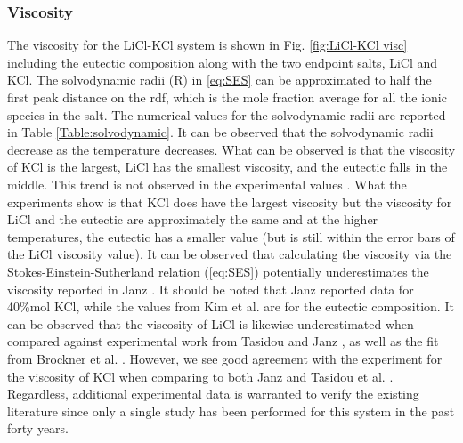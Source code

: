 \documentclass[review]{elsarticle}
\providecommand{\DIFdelbegin}{} %
\newcommand{\DIFscaledelfig}{0.5}
\newlength{\DIFdelgraphicswidth} %
\newlength{\DIFdelgraphicsheight} %
\newcommand{\DIFdelincludegraphics}[2][]{%
\sbox{\DIFdelgraphicsbox}{\DIFOincludegraphics[#1]{#2}}%
\settoboxwidth{\DIFdelgraphicswidth}{\DIFdelgraphicsbox} %
\settoboxtotalheight{\DIFdelgraphicsheight}{\DIFdelgraphicsbox} %
\scalebox{\DIFscaledelfig}{%
\parbox[b]{\DIFdelgraphicswidth}{\usebox{\DIFdelgraphicsbox}\\[-\baselineskip] \rule{\DIFdelgraphicswidth}{0em}}\llap{\resizebox{\DIFdelgraphicswidth}{\DIFdelgraphicsheight}{%
\setlength{\unitlength}{\DIFdelgraphicswidth}%
\begin{picture}(1,1)%
\thicklines\linethickness{2pt} %
{\color[rgb]{1,0,0}\put(0,0){\framebox(1,1){}}}%
{\color[rgb]{1,0,0}\put(0,0){\line( 1,1){1}}}%
{\color[rgb]{1,0,0}\put(0,1){\line(1,-1){1}}}%
\end{picture}%
}\hspace*{3pt}}} %
} %
\DeclareRobustCommand{\DIFdelbegin}{\DIFOdelbegin \let\includegraphics\DIFdelincludegraphics} %
\begin{document}
\subsubsection{Viscosity}
The viscosity for the LiCl-KCl system is shown in Fig. \ref{fig:LiCl-KCl visc} including the eutectic composition along with the two endpoint salts, LiCl and KCl. The solvodynamic radii (R) in \cref{eq:SES} can be approximated to half the first peak distance on the rdf, which is the mole fraction average for all the ionic species in the salt. The numerical values for the solvodynamic radii are reported in Table \ref{Table:solvodynamic}. It can be observed that the solvodynamic radii decrease as the temperature decreases. What can be observed is that the viscosity of KCl is the largest, LiCl has the smallest viscosity, and the eutectic falls in the middle. This trend is not observed in the experimental values \cite{janz_visc,janz_nist,janz_osti,kim2012high,brockner1975high,Tasidou}. What the experiments show is that KCl does have the largest viscosity but the viscosity for LiCl and the eutectic are approximately the same and at the higher temperatures, the eutectic has a smaller value (but is still within the error bars of the LiCl viscosity value). It can be observed that calculating the viscosity via the Stokes-Einstein-Sutherland relation (\cref{eq:SES}) potentially underestimates the viscosity reported in Janz \cite{janz_visc}. It should be noted that Janz reported data for 40\%mol KCl, while the values from Kim et al. \cite{kim2012high} are for the eutectic composition. It can be observed that the viscosity of LiCl is likewise underestimated when compared against experimental work from Tasidou \cite{tadano2014anharmonic} and Janz \cite{janz_nist,janz_osti}, as well as the fit from Brockner et al. \cite{brockner1975high}. However, we see good agreement with the experiment for the viscosity of KCl when comparing to both Janz \cite{janz_nist} and Tasidou et al. \cite{Tasidou}. Regardless, additional experimental data is warranted to verify the existing literature since only a single study has been performed for this system in the past forty years.\DIFdelbegin %
\end{document}
